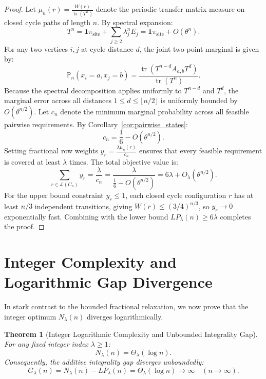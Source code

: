 \documentclass[11pt,a4paper]{article}
\newtheorem{theorem}{Theorem}[section]
\theoremstyle{definition}
\theoremstyle{remark}
\begin{document}
\begin{proof}
Let $\mu_n(r) = \frac{W(r)}{\operatorname{tr}(T^n)}$ denote the periodic transfer matrix measure on closed cycle paths of length $n$.
By spectral expansion:
\begin{equation}
    T^n = \mathbf{1} \pi_{\text{site}} + \sum_{j \ge 2} \lambda_j^n E_j = \mathbf{1} \pi_{\text{site}} + O(\theta^n).
\end{equation}
For any two vertices $i, j$ at cycle distance $d$, the joint two-point marginal is given by:
\begin{equation}
    \mathbb{P}_n(x_i = a, x_j = b) = \frac{\operatorname{tr}\left( T^{n-d} A_{a, b} T^d \right)}{\operatorname{tr}(T^n)}.
\end{equation}
Because the spectral decomposition applies uniformly to $T^{n-d}$ and $T^d$, the marginal error across all distances $1 \le d \le \lfloor n/2 \rfloor$ is uniformly bounded by $O(\theta^{n/2})$.
Let $c_n$ denote the minimum marginal probability across all feasible pairwise requirements. By Corollary~\ref{cor:pairwise_states}:
\begin{equation}
    c_n = \frac{1}{6} - O(\theta^{n/2}).
\end{equation}
Setting fractional row weights $y_r = \frac{\lambda \mu_n(r)}{c_n}$ ensures that every feasible requirement is covered at least $\lambda$ times. The total objective value is:
\begin{equation}
    \sum_{r \in \mathcal{L}(C_n)} y_r = \frac{\lambda}{c_n} = \frac{\lambda}{\frac{1}{6} - O(\theta^{n/2})} = 6\lambda + O_\lambda(\theta^{n/2}).
\end{equation}
For the upper bound constraint $y_r \le 1$, each closed cycle configuration $r$ has at least $n/3$ independent transitions, giving $W(r) \le (3/4)^{n/3}$, so $y_r \to 0$ exponentially fast.
Combining with the lower bound $LP_\lambda(n) \ge 6\lambda$ completes the proof.
\end{proof}

\section{Integer Complexity and Logarithmic Gap Divergence}
\label{sec:integer_divergence}

In stark contrast to the bounded fractional relaxation, we now prove that the integer optimum $N_\lambda(n)$ diverges logarithmically.

\begin{theorem}[Integer Logarithmic Complexity and Unbounded Integrality Gap]
\label{thm:integer_divergence}
For any fixed integer index $\lambda \ge 1$:
\begin{equation}
    N_\lambda(n) = \Theta_\lambda(\log n).
\end{equation}
Consequently, the additive integrality gap diverges unboundedly:
\begin{equation}
    G_\lambda(n) = N_\lambda(n) - LP_\lambda(n) = \Theta_\lambda(\log n) \longrightarrow \infty \quad (n \to \infty).
\end{equation}
\end{theorem}
\end{document}
